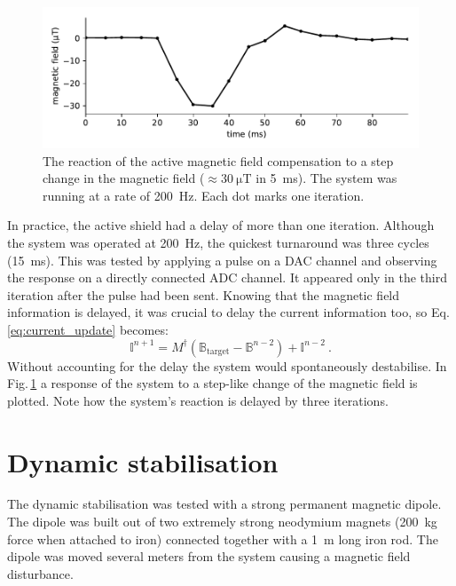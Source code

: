 \begin{figure}
  \centering
  \includegraphics[width=.9\linewidth]{gfx/prototype/SFC_step_response.pdf}
  \caption{The reaction of the active magnetic field compensation to a step change in the magnetic field ($\approx \SI{30}{\micro\tesla}$ in \SI{5}{\milli\second}). The system was running at a rate of \SI{200}{\hertz}. Each dot marks one iteration.}\label{fig:prototype_step_response}
\end{figure}

In practice, the active shield had a delay of more than one iteration.
Although the system was operated at \SI{200}{\hertz}, the quickest turnaround was three cycles (\SI{15}{\milli\second}).
This was tested by applying a pulse on a DAC channel and observing the response on a directly connected ADC channel.
It appeared only in the third iteration after the pulse had been sent.
Knowing that the magnetic field information is delayed, it was crucial to delay the current information too, so Eq.\,\ref{eq:current_update} becomes:
\begin{equation}
  \mathbb{I}^{n+1} = M^\dagger \left( \mathbb{B}_\text{target} - \mathbb{B}^{n-2} \right) + \mathbb{I}^{n-2} \ .
\end{equation}
Without accounting for the delay the system would spontaneously destabilise.
In Fig.\,\ref{fig:prototype_step_response} a response of the system to a step-like change of the magnetic field is plotted.
Note how the system's reaction is delayed by three iterations.






\section{Dynamic stabilisation}
\label{sec:dynamic_stabilisation}
The dynamic stabilisation was tested with a strong permanent magnetic dipole.
The dipole was built out of two extremely strong neodymium magnets (\SI{200}{\kilo\gram} force when attached to iron) connected together with a \SI{1}{\metre} long iron rod.
The dipole was moved several meters from the system causing a magnetic field disturbance.

